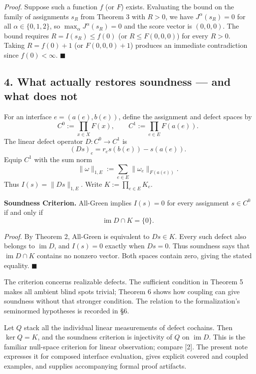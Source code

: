 \documentclass[
  11pt,
]{article}
\theoremstyle{plain}
\theoremstyle{definition}\newtheorem{definition}[theorem]{Definition}
\theoremstyle{remark}\newtheorem*{remark}{Remark}
\begin{document}
\emph{Proof.} Suppose such a function \(f\) (or \(F\)) exists.
Evaluating the bound on the family of assignments \(s_R\) from Theorem 3
with \(R > 0\), we have \(J^\alpha(s_R) = 0\) for all
\(\alpha \in \{0, 1, 2\}\), so \(\max_\alpha J^\alpha(s_R) = 0\) and the
score vector is \((0, 0, 0)\). The bound requires
\(R = I(s_R) \le f(0)\) (or \(R \le F(0, 0, 0)\)) for every \(R > 0\).
Taking \(R = f(0) + 1\) (or \(F(0, 0, 0) + 1\)) produces an immediate
contradiction since \(f(0) < \infty\). \(\blacksquare\)

\subsection{4. What actually restores soundness --- and what does
not}\label{what-actually-restores-soundness-and-what-does-not}

For an interface \(e=(a(e),b(e))\), define the assignment and defect
spaces by \[C^0:=\prod_{x\in X}F(x),\qquad
C^1:=\prod_{e\in E}F(a(e)).\] The linear defect operator
\(D: C^0\to C^1\) is \[(Ds)_e=r_e s(b(e))-s(a(e)).\] Equip \(C^1\) with
the sum norm
\[\lVert\omega\rVert_{1,E}:=\sum_{e\in E}\lVert\omega_e\rVert_{F(a(e))}.\]
Thus \(I(s)=\lVert Ds\rVert_{1,E}\). Write \(K:=\prod_{e\in E}K_e\).

\textbf{Soundness Criterion.} All-Green implies \(I(s)=0\) for every
assignment \(s\in C^0\) if and only if
\[\operatorname{im}D\cap K=\{0\}.\]

\emph{Proof.} By Theorem 2, All-Green is equivalent to \(Ds\in K\).
Every such defect also belongs to \(\operatorname{im}D\), and \(I(s)=0\)
exactly when \(Ds=0\). Thus soundness says that
\(\operatorname{im}D\cap K\) contains no nonzero vector. Both spaces
contain zero, giving the stated equality. \(\blacksquare\)

The criterion concerns realizable defects. The sufficient condition in
Theorem 5 makes all ambient blind spots trivial; Theorem 6 shows how
coupling can give soundness without that stronger condition. The
relation to the formalization's seminormed hypotheses is recorded in §6.

Let \(Q\) stack all the individual linear measurements of defect
cochains. Then \(\ker Q=K\), and the soundness criterion is injectivity
of \(Q\) on \(\operatorname{im}D\). This is the familiar null-space
criterion for linear observation; compare {[}2{]}. The present note
expresses it for composed interface evaluation, gives explicit covered
and coupled examples, and supplies accompanying formal proof artifacts.
\end{document}
